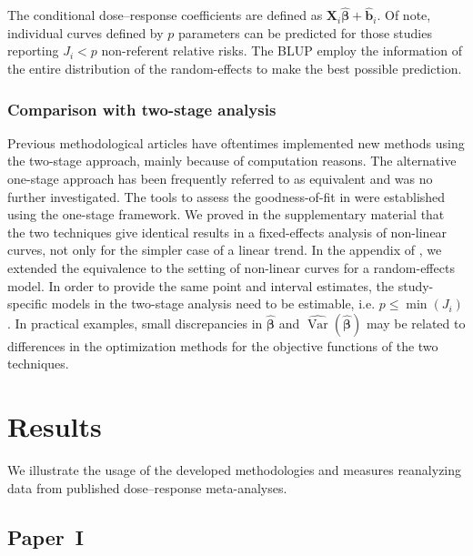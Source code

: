 \documentclass[11pt,a4paper,twoside,openany]{book}\usepackage{knitr}
\DeclareMathOperator{\Var}{Var}
\begin{document}
{The conditional dose--response coefficients are defined as $\mathbf{X}_i\hat{\boldsymbol{\beta}} + \hat {\mathbf{b}}_i$. Of note, individual curves defined by $p$ parameters can be predicted for those studies reporting $J_i < p$ non-referent relative risks. The BLUP employ the information of the entire distribution of the random-effects to make the best possible prediction.

\subsection{Comparison with two-stage analysis}

Previous methodological articles have oftentimes implemented new methods using the two-stage approach, mainly because of computation reasons. The alternative one-stage approach has been frequently referred to as equivalent and was no further investigated. The tools to assess the goodness-of-fit in  were established using the one-stage framework. We proved in the supplementary material that the two techniques give identical results in a fixed-effects analysis of non-linear curves, not only for the simpler case of a linear trend. In the appendix of , we extended the equivalence to the setting of non-linear curves for a random-effects model. In order to provide the same point and interval estimates, the study-specific models in the two-stage analysis need to be estimable, i.e. $p \le \min(J_i)$. In practical examples, small discrepancies in $\boldsymbol{\hat \beta}$ and $\widehat{\Var} \left( \boldsymbol{\hat \beta} \right)$ may be related to differences in the optimization methods for the objective functions of the two techniques.


%

\chapter{Results}

We illustrate the usage of the developed methodologies and measures reanalyzing data from published dose--response meta-analyses. 

\section{Paper~I}\label{sec:res_paperI}

}
\end{document}
